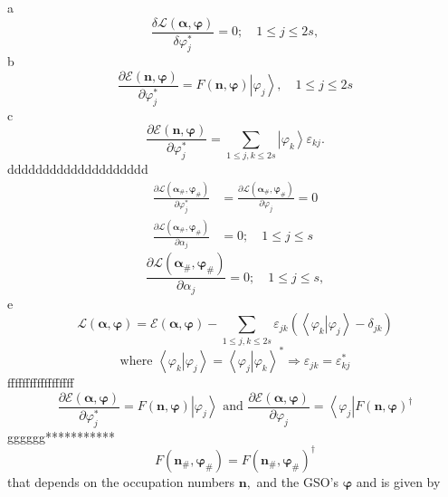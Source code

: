 \documentclass[aps,preprint]{revtex4}%
\begin{document}
a%
\[
\frac{\delta\mathcal{L}\left(  \mathbf{\alpha,\varphi}\right)  }{\delta
\varphi_{j}^{\ast}}=0;\quad1\leq j\leq2s,
\]
b%
\[
\frac{\partial\mathcal{E}\left(  \mathbf{n,\varphi}\right)  }{\partial
\varphi_{j}^{\ast}}=F\left(  \mathbf{n,\varphi}\right)  \left\vert \varphi
_{j}\right\rangle ,\quad1\leq j\leq2s
\]
c%
\[
\frac{\partial\mathcal{E}\left(  \mathbf{n,\varphi}\right)  }{\partial
\varphi_{j}^{\ast}}=\sum_{1\leq j,k\leq2s}\left\vert \varphi_{k}\right\rangle
\varepsilon_{kj}.
\]
dddddddddddddddddddd%
\begin{align*}
\frac{\partial\mathcal{L}\left(  \mathbf{\alpha}_{\#}\mathbf{,\varphi}%
_{\#}\right)  }{\partial\varphi_{j}^{\ast}}  &  =\frac{\partial\mathcal{L}%
\left(  \mathbf{\alpha}_{\#}\mathbf{,\varphi}_{\#}\right)  }{\partial
\varphi_{j}}=0\\
\frac{\partial\mathcal{L}\left(  \mathbf{\alpha}_{\#}\mathbf{,\varphi}%
_{\#}\right)  }{\partial\alpha_{j}}  &  =0;\quad1\leq j\leq s
\end{align*}%
\[
\frac{\partial\mathcal{L}\left(  \mathbf{\alpha}_{\#}\mathbf{,\varphi}%
_{\#}\right)  }{\partial\alpha_{j}}=0;\quad1\leq j\leq s,
\]
e%
\[
\mathcal{L}\left(  \mathbf{\alpha,\varphi}\right)  =\mathcal{E}\left(
\mathbf{\alpha,\varphi}\right)  -\sum_{1\leq j,k\leq2s}\varepsilon_{jk}\left(
\left\langle \left.  \varphi_{k}\right\vert \varphi_{j}\right\rangle
-\delta_{jk}\right)
\]%
\[
\text{where }\left\langle \left.  \varphi_{k}\right\vert \varphi
_{j}\right\rangle =\left\langle \left.  \varphi_{j}\right\vert \varphi
_{k}\right\rangle ^{\ast}\Rightarrow\varepsilon_{jk}=\varepsilon_{kj}^{\ast}%
\]
ffffffffffffffffff%
\[
\frac{\partial\mathcal{E}\left(  \mathbf{\alpha,\varphi}\right)  }%
{\partial\varphi_{j}^{\ast}}=F\left(  \mathbf{n,\varphi}\right)  \left\vert
\varphi_{j}\right\rangle \text{ and }\frac{\partial\mathcal{E}\left(
\mathbf{\alpha,\varphi}\right)  }{\partial\varphi_{j}}=\left\langle
\varphi_{j}\right\vert F\left(  \mathbf{n,\varphi}\right)  ^{\dagger}%
\]
gggggg***********%
\[
F\left(  \mathbf{n}_{\#}\mathbf{,\varphi}_{\#}\right)  =F\left(
\mathbf{n}_{\#}\mathbf{,\varphi}_{\#}\right)  ^{\dagger}%
\]
that depends on the occupation numbers $\mathbf{n,}$ and the GSO's
$\mathbf{\varphi}$ and is given by
\end{document}

